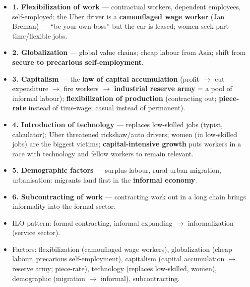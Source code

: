\begin{KeyConcept}
\begin{itemize}
    \item \textbf{1. Flexibilization of work} --- contractual workers, dependent employees, self-employed; the Uber driver is a \textbf{camouflaged wage worker} (Jan Breman) --- ``be your own boss'' but the car is leased; women seek part-time/flexible jobs.
    \item \textbf{2. Globalization} --- global value chains; cheap labour from Asia; shift from \textbf{secure to precarious self-employment}.
    \item \textbf{3. Capitalism} --- the \textbf{law of capital accumulation} (profit $\rightarrow$ cut expenditure $\rightarrow$ fire workers $\rightarrow$ \textbf{industrial reserve army} = a pool of informal labour); \textbf{flexibilization of production} (contracting out; \textbf{piece-rate} instead of time-wage; casual instead of permanent).
    \item \textbf{4. Introduction of technology} --- replaces low-skilled jobs (typist, calculator); Uber threatened rickshaw/auto drivers; women (in low-skilled jobs) are the biggest victims; \textbf{capital-intensive growth} puts workers in a race with technology and fellow workers to remain relevant.
    \item \textbf{5. Demographic factors} --- surplus labour, rural-urban migration, urbanisation: migrants land first in the \textbf{informal economy}.
    \item \textbf{6. Subcontracting of work} --- contracting work out in a long chain brings informality into the formal sector.
\end{itemize}
\end{KeyConcept}

\begin{QuickRevision}
\begin{itemize}
    \item ILO pattern: formal contracting, informal expanding $\rightarrow$ informalization (service sector).
    \item Factors: flexibilization (camouflaged wage workers), globalization (cheap labour, precarious self-employment), capitalism (capital accumulation $\rightarrow$ reserve army; piece-rate), technology (replaces low-skilled, women), demographic (migration $\rightarrow$ informal), subcontracting.
\end{itemize}
\end{QuickRevision}

